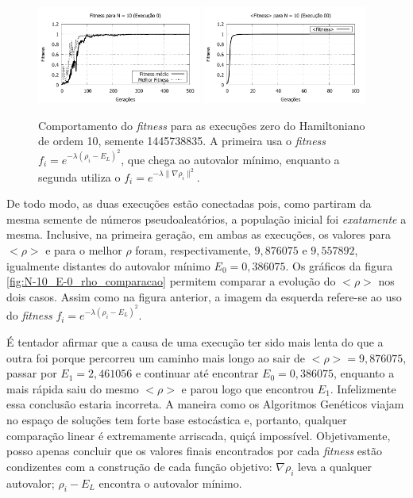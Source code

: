 	\begin{figure}[htbp]
		\centering
			\includegraphics[width=0.48\textwidth]{figs/resultados/fitnessEL/N-10_E-0_fitness.pdf}
			\includegraphics[width=0.48\textwidth]{figs/resultados/fitnessGrad/N10_00_fitness.pdf}
		\caption{Comportamento do \textit{fitness} para as execuções zero do Hamiltoniano de ordem 10, semente 1445738835. A primeira usa o \textit{fitness} $f_i = e^{-\lambda(\rho_i - E_L)^2}$, que chega ao autovalor mínimo, enquanto a segunda utiliza o $f_i = e^{-\lambda \| \nabla \rho_i \|^2}$.}
		\label{fig:N-10_E-0_fitness}
	\end{figure}
	
	De todo modo, as duas execuções estão conectadas pois, como partiram da mesma semente de números pseudoaleatórios, a população inicial foi \textit{exatamente} a mesma. Inclusive, na primeira geração, em ambas as execuções, os valores para $<\rho>$ e para o melhor $\rho$ foram, respectivamente, $9,876075$ e $9,557892$, igualmente distantes do autovalor mínimo $E_0 = 0,386075$. Os gráficos da figura \ref{fig:N-10_E-0_rho_comparacao} permitem comparar a evolução do $<\rho>$ nos dois casos. Assim como na figura anterior, a imagem da esquerda refere-se ao uso do \textit{fitness} $f_i = e^{-\lambda(\rho_i - E_L)^2}$.
	
	É tentador afirmar que a causa de uma execução ter sido mais lenta do que a outra foi porque percorreu um caminho mais longo ao sair de $<\rho> = 9,876075$, passar por $E_1 = 2,461056$ e continuar até encontrar $E_0 = 0,386075$, enquanto a mais rápida saiu do mesmo $<\rho>$ e parou logo que encontrou $E_1$. Infelizmente essa conclusão estaria incorreta. A maneira como os Algoritmos Genéticos viajam no espaço de soluções tem forte base estocástica e, portanto, qualquer comparação linear é extremamente arriscada, quiçá impossível. Objetivamente, posso apenas concluir que os valores finais encontrados por cada \textit{fitness} estão condizentes com a construção de cada função objetivo: $\nabla \rho_i$ leva a qualquer autovalor; $\rho_i - E_L$ encontra o autovalor mínimo.
	
